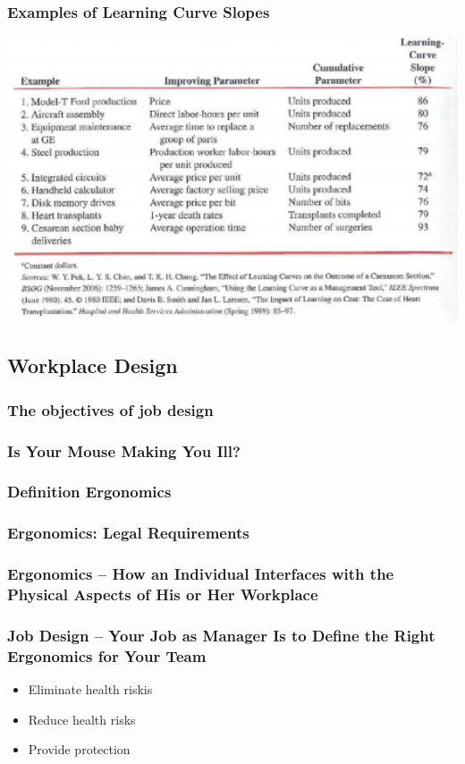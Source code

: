 \subsubsection{Examples of Learning Curve Slopes}
\includegraphics[width=1\textwidth]{W05/learningcourveslope}
\subsection{Workplace Design}
\subsubsection{The objectives of job design}
\subsubsection{Is Your Mouse Making You Ill?}
\subsubsection{Definition Ergonomics}
\subsubsection{Ergonomics: Legal Requirements}
\subsubsection{Ergonomics – How an Individual Interfaces with the Physical Aspects of His or Her Workplace}
\subsubsection{Job Design – Your Job as Manager Is to Define the Right Ergonomics for Your Team}
\begin{itemize}
\item Eliminate health riskis
\item Reduce health risks
\item Provide protection
\end{itemize}
